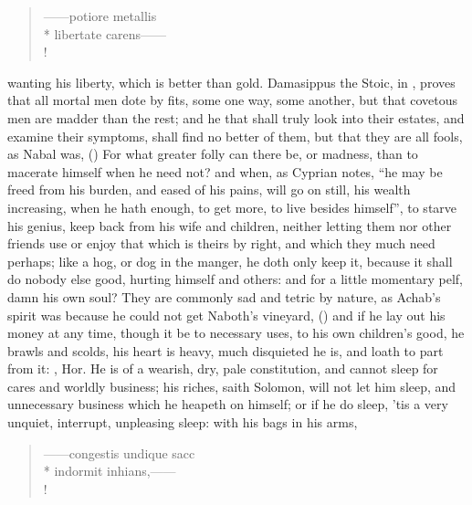 \begin{latin}
\begin{verse}%
------potiore metallis\\*
libertate carens------\\!
\end{verse}%
\end{latin}
wanting his liberty, which is better than gold. Damasippus the Stoic, in
\Horace{}, proves that all mortal men dote by fits, some one way, some another,
but that covetous men are madder than the rest; and he
that shall truly look into their estates, and examine their symptoms, shall
find no better of them, but that they are all fools, as
Nabal was,  () For what greater folly can
there be, or madness, than to macerate himself when he
need not? and when, as Cyprian notes, \enquote{he may be freed
from his burden, and eased of his pains, will go on still, his wealth
increasing, when he hath enough, to get more, to live besides himself}, to
starve his genius, keep back from his wife and children,
neither letting them nor other friends use or enjoy that which is theirs by
right, and which they much need perhaps; like a hog, or dog in the manger, he
doth only keep it, because it shall do nobody else good, hurting himself and
others: and for a little momentary pelf, damn his own soul? They are commonly
sad and tetric by nature, as Achab's spirit was because he could not get
Naboth's vineyard, () and if he lay out his money at any
time, though it be to necessary uses, to his own children's good, he brawls and
scolds, his heart is heavy, much disquieted he is, and loath to part from it:
, Hor. He is of a wearish, dry, pale
constitution, and cannot sleep for cares and worldly business; his riches,
saith Solomon, will not let him sleep, and unnecessary business which he
heapeth on himself; or if he do sleep, 'tis a very unquiet, interrupt,
unpleasing sleep: with his bags in his arms,

\begin{latin}
\begin{verse}%
------congestis undique sacc\\*
indormit inhians,------\\!
\end{verse}%
\end{latin}

